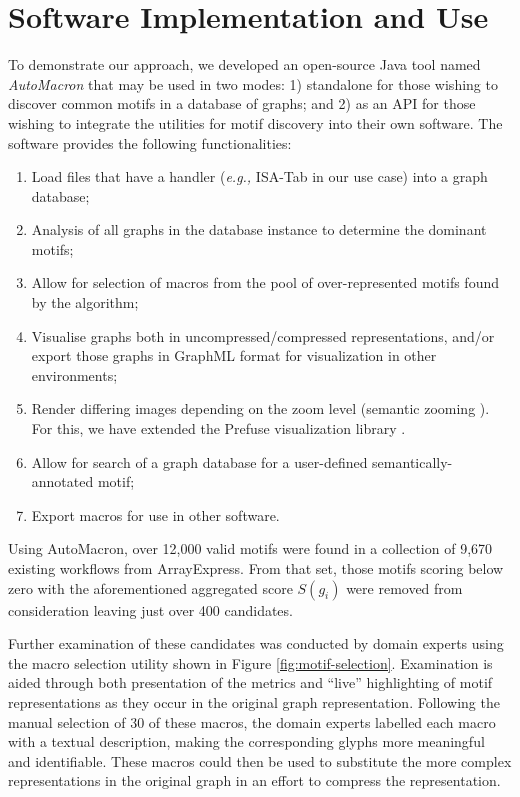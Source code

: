 \section{Software Implementation and Use}

To demonstrate our approach, we developed an open-source Java tool named \emph{AutoMacron} that may be used in two modes: 1) standalone for those wishing to discover common motifs in a database of graphs; and 2) as an API for those wishing to integrate the utilities for motif discovery into their own software.
The software provides the following functionalities:

\vspace{-2mm}
\begin{enumerate}[itemsep=-1mm]
\item Load files that have a handler (\emph{e.g.,} ISA-Tab in our use case) into a graph database;
\item Analysis of all graphs in the database instance to determine the dominant motifs;
\item Allow for selection of macros from the pool of over-represented motifs found by the algorithm;
\item Visualise graphs both in uncompressed/compressed representations, and/or export those graphs in GraphML format for visualization in other environments; 
\item Render differing images depending on the zoom level (semantic zooming \cite{bedersonpad:1994,weaverbuilding2004}). For this, we have extended the Prefuse visualization library \cite{heer05}.
\item Allow for search of a graph database for a user-defined semantically-annotated motif;
\item Export macros for use in other software.
\end{enumerate}

\vspace{-1mm}
Using AutoMacron, over 12,000 valid motifs were found in a collection of 9,670 existing workflows from ArrayExpress. From that set, those motifs scoring below zero with the aforementioned aggregated score $S(g_i)$ were removed from consideration leaving just over 400 candidates. 

Further examination of these candidates was conducted by domain experts using the macro selection utility shown in Figure \ref{fig:motif-selection}.
Examination is aided through both presentation of the metrics and ``live'' highlighting of motif representations as they occur in the original graph representation.
Following the manual selection of 30 of these macros, the domain experts labelled each macro with a textual description, making the corresponding glyphs more meaningful and identifiable. These macros could then be used to substitute the more complex representations in the original graph in an effort to compress the representation.

